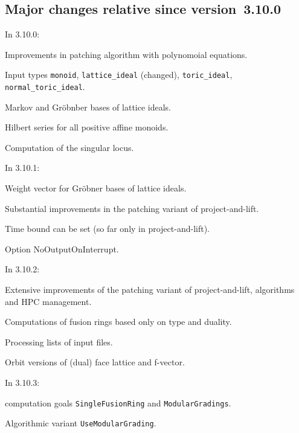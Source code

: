 \subsection{Major changes relative since version~3.10.0}


In 3.10.0:

\begin{arab}
	\item Improvements in patching algorithm with polynomoial equations.
	\item Input types \verb|monoid|, \verb|lattice_ideal| (changed), \verb|toric_ideal|, \verb|normal_toric_ideal|.
	\item  Markov and Gröbnber bases of lattice ideals.
	\item Hilbert series for all positive affine monoids.
	\item Computation of the singular locus.
\end{arab}

In 3.10.1:

\begin{arab}
	\item Weight vector for Gröbner bases of lattice ideals.
	\item Substantial improvements in the patching variant of project-and-lift.
	\item Time bound can be set (so far only in project-and-lift).
	\item Option NoOutputOnInterrupt. 
\end{arab}

In 3.10.2:

\begin{arab}
	\item Extensive improvements of the patching variant of project-and-lift, algorithms and HPC management.
	\item Computations of fusion rings based only on type and duality.
	\item Processing lists of input files.
	\item Orbit versions of (dual) face lattice and f-vector.
\end{arab}

In 3.10.3:

\begin{arab}
	\item computation goals \verb*|SingleFusionRing| and \verb*|ModularGradings|.
	\item Algorithmic variant \verb*|UseModularGrading|.
\end{arab}

